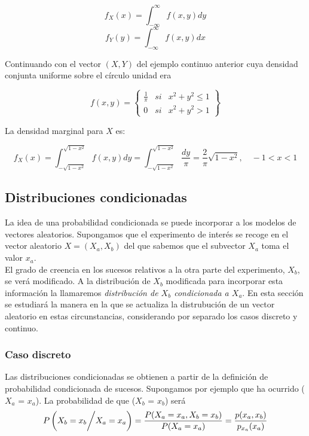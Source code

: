 \[ f_{X}(x) = \int_{-\infty}^{\infty} f(x, y)dy \]
\[ f_{Y}(y) = \int_{-\infty}^{\infty} f(x, y)dx \]

\begin{theorem}
    Continuando con el vector $(X, Y)$ del ejemplo continuo anterior cuya densidad conjunta uniforme sobre el 
    círculo unidad era

    \[f(x, y) = \left\{
        \begin{array}{rcr}
            \frac{1}{\pi}   & si    & x^2 + y^2 \leq 1 \\
            0               & si    & x^2 + y^2 > 1
        \end{array}
    \right\}\]

    La densidad marginal para $X$ es:

    \[ f_{X}(x) = \int_{-\sqrt{1 - x^2}}^{\sqrt{1 - x^2}} f(x, y) dy = \int_{-\sqrt{1 - x^2}}^{\sqrt{1 - x^2}} \frac{dy}{\pi} = \frac{2}{\pi} \sqrt{1 - x^2}, \quad -1 < x < 1 \]

\end{theorem}

\subsection{Distribuciones condicionadas}

La idea de una probabilidad condicionada se puede incorporar a los modelos de vectores aleatorios. Supongamos que el experimento
de interés se recoge en el vector aleatorio $X = (X_a, X_b)$ del que sabemos que el subvector $X_a$ toma el valor $x_a$. \\
El grado de creencia en los sucesos relativos a la otra parte del experimento, $X_b$, se verá modificado. A la distribución de $X_b$
modificada para incorporar esta información la llamaremos \textit{distribución de $X_b$ condicionada a $X_a$}.
En esta sección se estudiará la manera en la que se actualiza la distrubución de un vector aleatorio en estas circunstancias, 
considerando por separado los casos discreto y continuo. 
\subsubsection{Caso discreto}
Las distribuciones condicionadas se obtienen a partir de la definición de probabilidad condicionada
de sucesos. Supongamos por ejemplo que ha ocurrido ($X_a$ = $x_a$). La probabilidad de que ($X_b$ = $x_b$)
será
\[ P\left( {X_{b} = x_{b}} \bigg{/} {X_{a} = x_{a}} \right) = \frac{P(X_{a} = x_{a}, X_{b} = x_{b})}{P(X_{a} = x_{a})} = \frac{p(x_{a}, x_{b})}{p_{x_{a}}(x_{a})} \]

